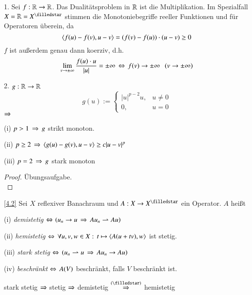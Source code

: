 \begin{description}
    \item{1.}
    Sei $f:\mathbb{R}\rightarrow\mathbb{R}$. Das Dualitätsproblem in $\mathbb{R}$ ist die Multiplikation. Im Spezialfall $X=\R=X^\star$
    stimmen die Monotoniebegriffe reeller Funktionen und für Operatoren überein, da
    \[
        \langle f(u)-f(v),u-v\rangle=(f(v)-f(u))\cdot(u-v)\geq 0
    \]
    $f$ ist außerdem genau dann koerziv, d.h.
    \[
        \lim_{v\rightarrow \pm \infty} \frac{f(u)\cdot u}{|u|}=\pm\infty \, \Leftrightarrow \, f(v)\rightarrow \pm \infty\hspace{.25cm}(v\rightarrow\pm
                \infty)
    \]
    \item{2.}
    $g:\mathbb{R}\rightarrow \mathbb{R}$
    \[
        g(u):=\begin{cases} |u|^{p-2}u, & u\neq 0\\ 0, & u=0 \end{cases}
    \]
    $\Rightarrow$ \begin{description}
        \item{(i)}
        $p>1 \, \Rightarrow \, g$ strikt monoton.
        \item{(ii)}
        $p\geq 2 \, \Rightarrow \, \langle g(u)-g(v),u-v\rangle \geq c|u-v|^p$
        \item{(iii)}
        $p=2 \, \Rightarrow \, g$ stark monoton
    \end{description}
    \begin{proof}
    Übungsaufgabe. \[ \]
    \end{proof}
\end{description}

\begin{defi}\ref{4.2}
    Sei $X$ reflexiver Banachraum und $A:X\ra X^\star$ ein Operator. $A$ heißt
    \begin{description}
    \item{(i)}
    \textit{demistetig} $\Leftrightarrow$ $\left( u_n\rightarrow u\, \Rightarrow \, Au_n\rightharpoonup Au \right)$
    \item{(ii)}
    \textit{hemistetig} $\Leftrightarrow \, \forall u,v,w \in X: \, t\mapsto \langle A(u+tv),w\rangle$ ist stetig.
    \item{(iii)}
    \textit{stark stetig} $\Leftrightarrow \, \left( u_n \rightharpoonup u\, \Rightarrow \, Au_n\rightarrow Au \right)$
    \item{(iv)}
    \textit{beschränkt} $\Leftrightarrow \, A(V)$ beschränkt, falls $V$ beschränkt ist. 
    \end{description}
\end{defi}

\begin{remark}
    stark stetig $\Rightarrow$ stetig $\Rightarrow$ demistetig $\overset{(\star)}{\Ra}$ hemistetig
\end{remark}

